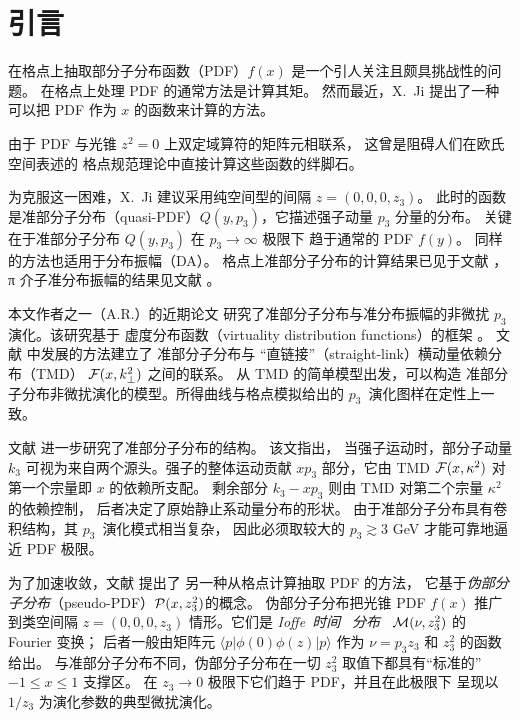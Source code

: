 \section{引言}

在格点上抽取部分子分布函数（PDF）$f(x)$ \cite{Feynman:1973xc}
是一个引人关注且颇具挑战性的问题。
在格点上处理 PDF 的通常方法是计算其矩。
然而最近，X.~Ji \cite{Ji:2013dva} 提出了一种
可以把 PDF 作为 $x$ 的函数来计算的方法。

由于 PDF 与光锥 $z^2=0$ 上双定域算符的矩阵元相联系，
这曾是阻碍人们在欧氏空间表述的
格点规范理论中直接计算这些函数的绊脚石。

为克服这一困难，X.~Ji 建议采用纯空间型的间隔 $z=(0,0,0,z_3)$。
此时的函数是准部分子分布（quasi-PDF）$Q(y,p_3)$，它描述强子动量
$p_3$ 分量的分布。
关键在于准部分子分布 $Q(y,p_3)$ 在 \mbox{$p_3 \to \infty$} 极限下
趋于通常的 PDF $f(y)$。
同样的方法也适用于分布振幅（DA）。
格点上准部分子分布的计算结果已见于文献
\cite{Lin:2014zya,Chen:2016utp,Alexandrou:2015rja}，
π 介子准分布振幅的结果见文献 \cite{Zhang:2017bzy}。

本文作者之一（A.R.）的近期论文 \cite{Radyushkin:2016hsy,Radyushkin:2017gjd}
研究了准部分子分布与准分布振幅的非微扰 $p_3$ 演化。该研究基于
虚度分布函数（virtuality distribution functions）的框架
\cite{Radyushkin:2014vla,Radyushkin:2015gpa}。
文献 \cite{Radyushkin:2016hsy,Radyushkin:2017gjd} 中发展的方法建立了
准部分子分布与
“直链接”（straight-link）横动量依赖分布（TMD）
${\cal F} (x, k_\perp^2)$ 之间的联系。
从 TMD 的简单模型出发，可以构造
准部分子分布非微扰演化的模型。所得曲线与格点模拟给出的
\mbox{$p_3$ 演化}图样在定性上一致。

文献 \cite{Radyushkin:2017cyf} 进一步研究了准部分子分布的结构。
该文指出，
当强子运动时，部分子动量 $k_3$
可视为来自两个源头。强子的整体运动贡献
$xp_3$ 部分，它由 TMD ${\cal F} (x, \kappa^2)$ 对第一个宗量即 $x$ 的依赖所支配。
剩余部分 $k_3-xp_3$
则由 TMD 对第二个宗量 $\kappa^2$ 的依赖控制，
后者决定了原始静止系动量分布的形状。
由于准部分子分布具有卷积结构，其 \mbox{$p_3$ 演化}模式相当复杂，
因此必须取较大的 $p_3 \gtrsim 3$ GeV 才能可靠地逼近 PDF 极限。

为了加速收敛，文献 \cite{Radyushkin:2017cyf} 提出了
另一种从格点计算抽取 PDF 的方法，
它基于{\it 伪部分子分布}（pseudo-PDF）$ {\cal P} (x, z_3^2) $的概念。
伪部分子分布把光锥 PDF $f(x)$ 推广到类空间隔
$z=(0,0,0,z_3)$ 情形。它们是
\mbox{{\it Ioffe 时间}\ \cite{Ioffe:1969kf}} \mbox{{\it 分布}\ \cite{Braun:1994jq}}
${\cal M} (\nu, z_3^2)$ 的 Fourier 变换；
后者一般由矩阵元 $  \langle p |   \phi(0) \phi (z)|p \rangle $
作为 $\nu = p_3 z_3$ 和 $z_3^2$ 的函数给出。
与准部分子分布不同，伪部分子分布在一切 $z_3^2$ 取值下都具有“标准的”
$-1 \leq x  \leq 1$ 支撑区。
在 $z_3\to 0$ 极限下它们趋于 PDF，并且在此极限下
呈现以 $1/z_3$ 为演化参数的典型微扰演化。


